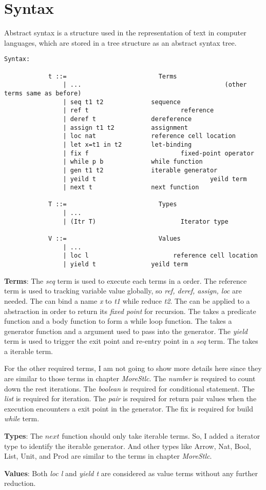 \section{Syntax}
\label{sec:approach}
Abstract syntax is a structure used in the representation of text in computer languages, which are stored in a tree structure as an abstract syntax tree.
%
\begin{lstlisting}[basicstyle=\small]
Syntax:

			t ::=                		  Terms
				| ...										(other terms same as before)
				| seq t1 t2             sequence
				| ref t					   	    reference 
				| deref t               dereference
				| assign t1 t2          assignment
				| loc nat               reference cell location
				| let x=t1 in t2        let-binding
				| fix f   					    fixed-point operator
				| while p b             while function 
				| gen t1 t2             iterable generator
				| yeild t								yeild term
				| next t                next function

			T ::=                		  Types
				| ...               		
				| (Itr T)				        Iterator type
			
			V ::=                		  Values
				| ... 
				| loc l				          reference cell location
				| yield t               yeild term
\end{lstlisting}
%

\textbf{Terms}: The \textit{seq} term is used to execute each terms in a order. 
The reference term is used to tracking variable value globally, so \textit{ref, deref, assign, loc} are needed. The \lt can bind a name \textit{x} to \textit{t1} while reduce \textit{t2}. 
The \fix can be applied to a abstraction in order to return its \textit{fixed point} for recursion. 
The \while takes a predicate function and a body function to form a while loop function. 
The \gen takes a generator function and a argument used to pass into the generator. 
The \textit{yield} term is used to trigger the exit point and re-entry point in a \textit{seq} term. 
The \nt takes a iterable term.

For the other required terms, I am not going to show more details here since they are similar to those terms in chapter \textit{MoreStlc}. The \textit{number} is required to count down the rest iterations. The \textit{boolean} is required for conditional statement. The \textit{list} is required for iteration. The \textit{pair} is required for return pair values when the execution encounters a exit point in the generator. The fix is required for build \textit{while} term.

\textbf{Types}: The $next$ function should only take iterable terms. 
So, I added a iterator type to identify the iterable generator. 
And other types like Arrow, Nat, Bool, List, Unit, and Prod are similar to the terms in chapter \textit{MoreStlc}.

\textbf{Values}: Both \textit{loc l} and \textit{yield t} are considered as value terms without any further reduction.